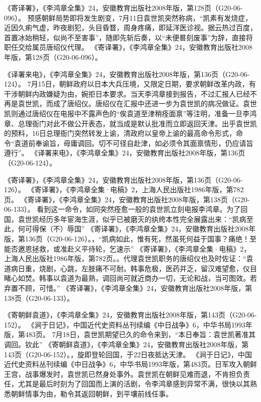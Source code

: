 \documentclass[12pt,UTF8]{ctexbook}
\begin{document}
《寄译署》，《李鸿章全集》24，安徽教育出版社2008年版，第128页（G20-06-096）。
预感朝鲜局势即将发生剧变，7月11日袁世凯突然称病，“凯素有发烧症，近因久痢气虚，昨夜剧犯，头目昏瞀，周身疼痛，即延洋医诊视。据云热过百度，首置冰始稍轻，似尚不至害事”，随即先斩后奏，以“未便晷刻废事”为辞，直接将职任交给属员唐绍仪代理。 《寄译署》，《李鸿章全集》24，安徽教育出版社2008年版，第128页（G20-06-096）。

《译署来电》，《李鸿章全集》24，安徽教育出版社2008年版，第136页（G20-06-124）。
7月15日，朝鲜政府以日本大兵压境，又限定日期，要求朝鲜改革内政，有干涉朝鲜内政嫌疑为由，婉拒日本要求。当天李鸿章接到报告，不过汇报人已经不再是袁世凯，而成了唐绍仪。唐绍仪在汇报中还进一步为袁世凯的病况做证。袁世凯则通过唐绍仪在电报中不露声色的“俟袁道至津稍痊面禀”等注明，准备一旦李鸿章、总理衙门对此不做公开表态，就当成是默认批准而立即返回天津。出乎袁世凯的预料，16日总理衙门突然转发上谕，清政府以皇帝上谕的最高命令形式，命令“袁道前奉谕旨，毋庸调回。切不可径自赴津，如必须令其面禀情形，仍应请旨遵行”。 《译署来电》，《李鸿章全集》24，安徽教育出版社2008年版，第136页（G20-06-124）。

《寄译署》，《李鸿章全集》24，安徽教育出版社2008年版，第136页（G20-06-126）。
《寄译署》，《李鸿章全集·电稿》2，上海人民出版社1986年版，第782页。
《寄译署》，《李鸿章全集》24，安徽教育出版社2008年版，第138页（G20-06-133）。
看到这一命令，如同突然痊愈一般的袁世凯立刻电报李鸿章。为了回国，袁世凯经历多年宦海生涯，似乎已被磨灭的纨绔本性完全展露出来：“凯病至此，何可得保（不）辱国” 《寄译署》，《李鸿章全集》24，安徽教育出版社2008年版，第136页（G20-06-126）。，“凯病如此，惟有死，然虽死何益于国事？痛绝！至能否邀恩拯救，或准赴义平待轮，乞速示” 《寄译署》，《李鸿章全集·电稿》2，上海人民出版社1986年版，第782页。。代理袁世凯职务的唐绍仪也及时佐证：“袁道病日重，烧剧，心跳，左肢痛不可耐。韩事危极，医药并乏，留汉难望愈，仪目睹心如焚。韩事以袁道为最熟，调回尚可就近商办一切，无论和战，当可图效。若弃置不顾，可惜。” 《寄译署》，《李鸿章全集》24，安徽教育出版社2008年版，第138页（G20-06-133）。

《寄朝鲜袁道》，《李鸿章全集》24，安徽教育出版社2008年版，第143页（G20-06-152）。
《涧于日记》，中国近代史资料丛刊续编《中日战争》6，中华书局1993年版，第483页。
7月18日，袁世凯期望已久的命令来到，“本日奉旨：袁世凯著准其调回。钦此” 《寄朝鲜袁道》，《李鸿章全集》24，安徽教育出版社2008年版，第143页（G20-06-152）。，旋即登轮回国，于22日夜抵达天津。 《涧于日记》，中国近代史资料丛刊续编《中日战争》6，中华书局1993年版，第483页。日军攻入朝鲜王宫，战事爆发时，袁世凯已然身处事外。袁世凯在朝鲜见难而退，不肯担负责任，尤其是最后时刻为了回国而上演的活剧，令李鸿章感到异常不满，很快以其熟悉朝鲜情事为由，勒令其返回朝鲜，到平壤前线任事。
\end{document}
